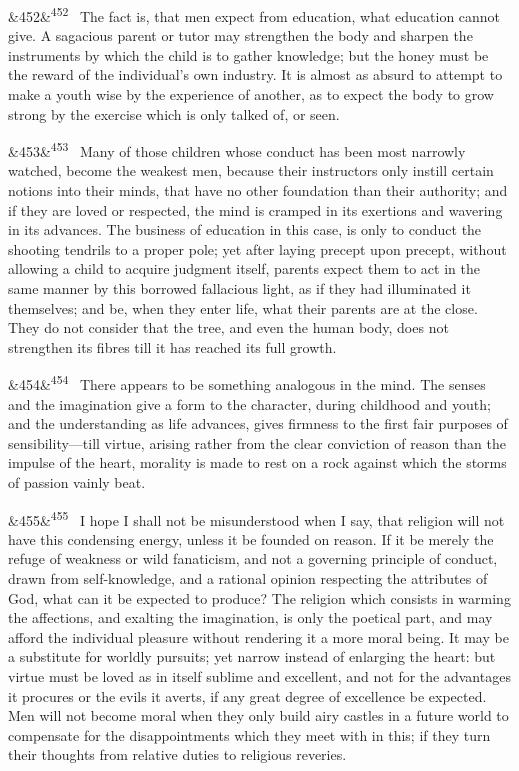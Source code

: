\documentclass[12pt]{article}
\newcommand{\para}[1][]{\par\noindent\ifx&#1&\else\textsuperscript{\footnotesize #1}~\fi}
\begin{document}
\para[452] The fact is, that men expect from education, what education cannot give. A sagacious parent or tutor may strengthen the body and sharpen the instruments by which the child is to gather knowledge; but the honey must be the reward of the individual's own industry. It is almost as absurd to attempt to make a youth wise by the experience of another, as to expect the body to grow strong by the exercise which is only talked of, or seen.

\para[453] Many of those children whose conduct has been most narrowly watched, become the weakest men, because their instructors only instill certain notions into their minds, that have no other foundation than their authority; and if they are loved or respected, the mind is cramped in its exertions and wavering in its advances. The business of education in this case, is only to conduct the shooting tendrils to a proper pole; yet after laying precept upon precept, without allowing a child to acquire judgment itself, parents expect them to act in the same manner by this borrowed fallacious light, as if they had illuminated it themselves; and be, when they enter life, what their parents are at the close. They do not consider that the tree, and even the human body, does not strengthen its fibres till it has reached its full growth.

\para[454] There appears to be something analogous in the mind. The senses and the imagination give a form to the character, during childhood and youth; and the understanding as life advances, gives firmness to the first fair purposes of sensibility---till virtue, arising rather from the clear conviction of reason than the impulse of the heart, morality is made to rest on a rock against which the storms of passion vainly beat.

\para[455] I hope I shall not be misunderstood when I say, that religion will not have this condensing energy, unless it be founded on reason. If it be merely the refuge of weakness or wild fanaticism, and not a governing principle of conduct, drawn from self-knowledge, and a rational opinion respecting the attributes of God, what can it be expected to produce? The religion which consists in warming the affections, and exalting the imagination, is only the poetical part, and may afford the individual pleasure without rendering it a more moral being. It may be a substitute for worldly pursuits; yet narrow instead of enlarging the heart: but virtue must be loved as in itself sublime and excellent, and not for the advantages it procures or the evils it averts, if any great degree of excellence be expected. Men will not become moral when they only build airy castles in a future world to compensate for the disappointments which they meet with in this; if they turn their thoughts from relative duties to religious reveries.
\end{document}
